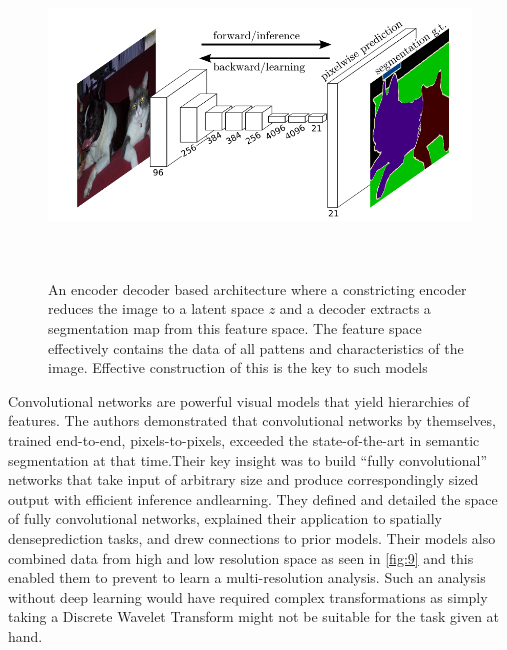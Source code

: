 \documentclass[19pt]{article}
\begin{document}
\begin{center}
    \begin{figure}[!h!t!b]
        \centerline{\includegraphics[width=135mm,height=85mm]{images/encdec.png}}
        \caption{An encoder decoder based architecture where a constricting encoder reduces the image to a latent space $z$ and a decoder extracts a segmentation map from this feature space. The feature space effectively contains the data of all pattens and characteristics of the image. Effective construction of this is the key to such models}
        \label{fig:8}
    \end{figure}
\end{center}
Convolutional networks are powerful visual models that yield  hierarchies  of  features. The authors demonstrated that  convolutional networks by themselves, trained end-to-end, pixels-to-pixels,  exceeded  the  state-of-the-art  in  semantic  segmentation at that time.Their key insight was  to  build  “fully  convolutional” networks  that  take  input  of  arbitrary  size  and  produce correspondingly sized  output  with  efficient  inference  andlearning.  They defined and detailed the space of fully convolutional networks, explained their application to spatially denseprediction tasks, and drew connections to prior models. 
\newpage
Their models also combined data from high and low resolution space as seen in \ref{fig:9} and this enabled them to prevent to learn a multi-resolution analysis. Such an analysis without deep learning would have required complex transformations as simply taking a Discrete Wavelet Transform might not be suitable for the task given at hand. 
\end{document}

